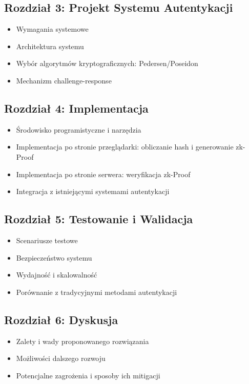 \documentclass{article}
\begin{document}
\subsection{Rozdział 3: Projekt Systemu Autentykacji}
\begin{itemize}
    \item Wymagania systemowe
    \item Architektura systemu
    \item Wybór algorytmów kryptograficznych: Pedersen/Poseidon
    \item Mechanizm challenge-response
\end{itemize}

\subsection{Rozdział 4: Implementacja}
\begin{itemize}
    \item Środowisko programistyczne i narzędzia
    \item Implementacja po stronie przeglądarki: obliczanie hash i generowanie zk-Proof
    \item Implementacja po stronie serwera: weryfikacja zk-Proof
    \item Integracja z istniejącymi systemami autentykacji
\end{itemize}

\subsection{Rozdział 5: Testowanie i Walidacja}
\begin{itemize}
    \item Scenariusze testowe
    \item Bezpieczeństwo systemu
    \item Wydajność i skalowalność
    \item Porównanie z tradycyjnymi metodami autentykacji
\end{itemize}

\subsection{Rozdział 6: Dyskusja}
\begin{itemize}
    \item Zalety i wady proponowanego rozwiązania
    \item Możliwości dalszego rozwoju
    \item Potencjalne zagrożenia i sposoby ich mitigacji
\end{itemize}
\end{document}
